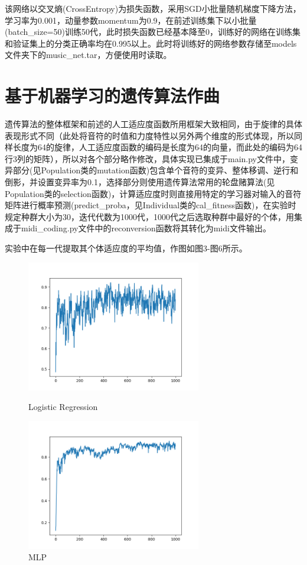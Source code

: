\documentclass[UTF8,a4paper,10pt]{ctexart}
\begin{document}
该网络以交叉熵(CrossEntropy)为损失函数，采用SGD小批量随机梯度下降方法，学习率为0.001，动量参数momentum为0.9，在前述训练集下以小批量(batch\_size=50)训练50代，此时损失函数已经基本降至0，训练好的网络在训练集和验证集上的分类正确率均在0.995以上。此时将训练好的网络参数存储至models文件夹下的music\_net.tar，方便使用时读取。



\section{\textcolor[rgb]{0,0.3,0.6}{基于机器学习的遗传算法作曲}}
遗传算法的整体框架和前述的人工适应度函数所用框架大致相同，由于旋律的具体表现形式不同（此处将音符的时值和力度特性以另外两个维度的形式体现，所以同样长度为64的旋律，人工适应度函数的编码是长度为64的向量，而此处的编码为64行3列的矩阵），所以对各个部分略作修改，具体实现已集成于main.py文件中，变异部分(见Population类的mutation函数)包含单个音符的变异、整体移调、逆行和倒影，并设置变异率为0.1，选择部分则使用遗传算法常用的轮盘赌算法(见Population类的selection函数)，计算适应度时则直接用特定的学习器对输入的音符矩阵进行概率预测(predict\_proba，见Individual类的cal\_fitness函数)，在实验时规定种群大小为30，迭代代数为1000代，1000代之后选取种群中最好的个体，用集成于midi\_coding.py文件中的reconversion函数将其转化为midi文件输出。

实验中在每一代提取其个体适应度的平均值，作图如图3-图6所示。

\begin{figure}[H]
\begin{minipage}[t]{0.5\linewidth}
\centering
\includegraphics[width=3in]{output_logreg.png}
\caption{Logistic Regression}
\label{fig:side:a}
\end{minipage}%
\begin{minipage}[t]{0.5\linewidth}
\centering
\includegraphics[width=3in]{output_mlp.png}
\caption{MLP}
\label{fig:side:b}
\end{minipage}
\end{figure}
\end{document}
